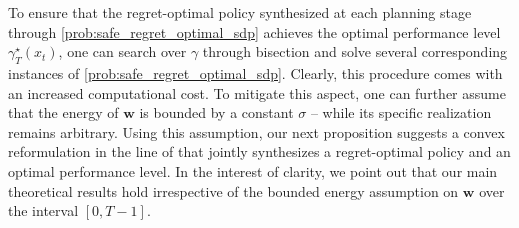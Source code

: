 \documentclass[conference]{IEEEtran}
\begin{document}
To ensure that the regret-optimal policy synthesized at each planning stage through \eqref{prob:safe_regret_optimal_sdp} achieves the optimal performance level $\gamma_T^\star(x_t)$, one can search over $\gamma$ through bisection and solve several corresponding instances of \eqref{prob:safe_regret_optimal_sdp}. Clearly, this procedure comes with an increased computational cost. To mitigate this aspect, one can further assume that the energy of $\mathbf{w}$ is bounded by a constant $\sigma$ – while its specific realization remains arbitrary.  Using this assumption, our next proposition suggests a convex reformulation in the line of \cite{didier2022system} that jointly synthesizes a regret-optimal policy and an optimal performance level. In the interest of clarity, we point out that our main theoretical results hold irrespective of the bounded energy assumption on $\mathbf{w}$ over the interval $[0, T-1]$.
\end{document}
